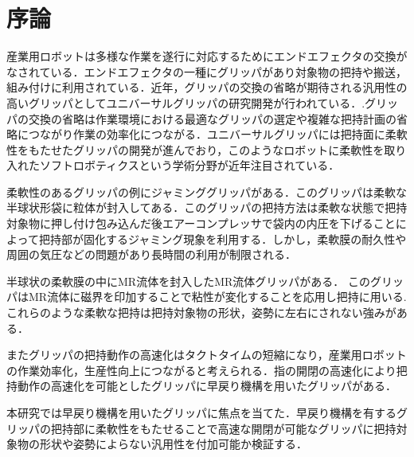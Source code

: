 \section{序論}
\label{sec:序論}








産業用ロボットは多様な作業を遂行に対応するためにエンドエフェクタの交換がなされている．エンドエフェクタの一種にグリッパがあり対象物の把持や搬送，組み付けに利用されている．近年，グリッパの交換の省略が期待される汎用性の高いグリッパとしてユニバーサルグリッパの研究開発が行われている．\cite{end}.グリッパの交換の省略は作業環境における最適なグリッパの選定や複雑な把持計画の省略につながり作業の効率化につながる．ユニバーサルグリッパには把持面に柔軟性をもたせたグリッパの開発が進んでおり，このようなロボットに柔軟性を取り入れたソフトロボティクス\cite{soft}という学術分野が近年注目されている．\par
柔軟性のあるグリッパの例にジャミンググリッパ\cite{jam}がある．このグリッパは柔軟な半球状形袋に粒体が封入してある．このグリッパの把持方法は柔軟な状態で把持対象物に押し付け包み込んだ後エアーコンプレッサで袋内の内圧を下げることによって把持部が固化するジャミング現象を利用する．しかし，柔軟膜の耐久性や周囲の気圧などの問題があり長時間の利用が制限される．\par
半球状の柔軟膜の中にMR流体を封入したMR流体グリッパ\cite{MR}がある．
このグリッパはMR流体に磁界を印加することで粘性が変化することを応用し把持に用いる.これらのような柔軟な把持は把持対象物の形状，姿勢に左右にされない強みがある．\par
またグリッパの把持動作の高速化はタクトタイムの短縮になり，産業用ロボットの作業効率化，生産性向上につながると考えられる．指の開閉の高速化により把持動作の高速化を可能としたグリッパに早戻り機構を用いたグリッパがある\cite{sh_hand}．\par
本研究では早戻り機構を用いたグリッパに焦点を当てた．早戻り機構を有するグリッパの把持部に柔軟性をもたせることで高速な開閉が可能なグリッパに把持対象物の形状や姿勢によらない汎用性を付加可能か検証する．

